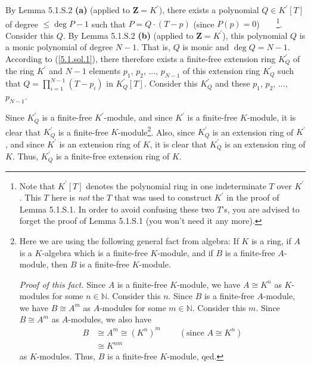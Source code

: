 \documentclass[numbers=enddot,12pt,final,onecolumn,notitlepage]{scrartcl}%
\begin{document}
By Lemma 5.1.S.2 \textbf{(a)} (applied to $\mathbf{Z}=K^{\prime}$), there
exists a polynomial $Q\in K^{\prime}\left[  T\right]  $ of degree $\leq\deg
P-1$ such that $P=Q\cdot\left(  T-p\right)  $ (since $P\left(  p\right)
=0$)\ \ \ \ \footnote{Note that $K^{\prime}\left[  T\right]  $ denotes the
polynomial ring in one indeterminate $T$ over $K^{\prime}$. This $T$ here is
\textit{not} the $T$ that was used to construct $K^{\prime}$ in the proof of
Lemma 5.1.S.1. In order to avoid confusing these two $T$'s, you are advised to
forget the proof of Lemma 5.1.S.1 (you won't need it any more).}. Consider
this $Q$. By Lemma 5.1.S.2 \textbf{(b)} (applied to $\mathbf{Z}=K^{\prime}$),
this polynomial $Q$ is a monic polynomial of degree $N-1$. That is, $Q$ is
monic and $\deg Q=N-1$. According to (\ref{5.1.sol.1}), there therefore exists
a finite-free extension ring $K_{Q}^{\prime}$ of the ring $K^{\prime}$ and
$N-1$ elements $p_{1}$, $p_{2}$, $...$, $p_{N-1}$ of this extension ring
$K_{Q}^{\prime}$ such that $Q=\prod\limits_{i=1}^{N-1}\left(  T-p_{i}\right)
$ in $K_{Q}^{\prime}\left[  T\right]  $. Consider this $K_{Q}^{\prime}$ and
these $p_{1}$, $p_{2}$, $...$, $p_{N-1}$.

Since $K_{Q}^{\prime}$ is a finite-free $K^{\prime}$-module, and since
$K^{\prime}$ is a finite-free $K$-module, it is clear that $K_{Q}^{\prime}$ is
a finite-free $K$-module\footnote{Here we are using the following general fact
from algebra: If $K$ is a ring, if $A$ is a $K$-algebra which is a finite-free
$K$-module, and if $B$ is a finite-free $A$-module, then $B$ is a finite-free
$K$-module.
\par
\textit{Proof of this fact.} Since $A$ is a finite-free $K$-module, we have
$A\cong K^{n}$ as $K$-modules for some $n\in\mathbb{N}$. Consider this $n$.
Since $B$ is a finite-free $A$-module, we have $B\cong A^{m}$ as $A$-modules
for some $m\in\mathbb{N}$. Consider this $m$. Since $B\cong A^{m}$ as
$A$-modules, we also have%
\begin{align*}
B  &  \cong A^{m}\cong\left(  K^{n}\right)  ^{m}\ \ \ \ \ \ \ \ \ \ \left(
\text{since }A\cong K^{n}\right) \\
&  \cong K^{nm}%
\end{align*}
as $K$-modules. Thus, $B$ is a finite-free $K$-module, qed.}. Also, since
$K_{Q}^{\prime}$ is an extension ring of $K^{\prime}$, and since $K^{\prime}$
is an extension ring of $K$, it is clear that $K_{Q}^{\prime}$ is an extension
ring of $K$. Thus, $K_{Q}^{\prime}$ is a finite-free extension ring of $K$.
\end{document}

